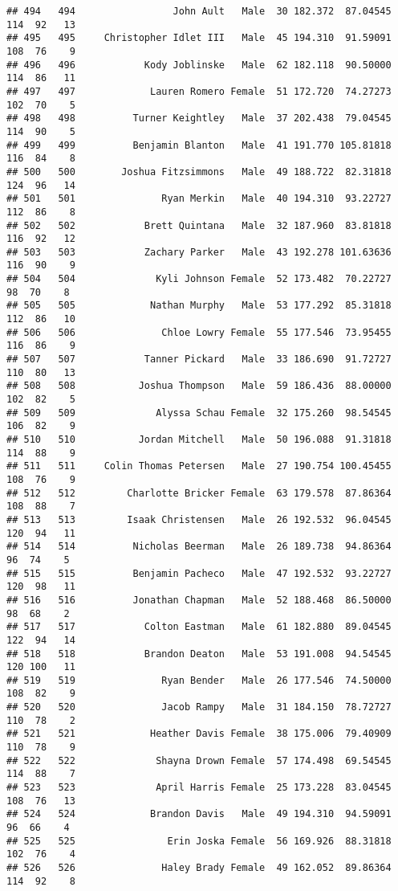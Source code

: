 \documentclass[
]{article}
\begin{document}
\begin{verbatim}
## 494   494                 John Ault   Male  30 182.372  87.04545 114  92   13
## 495   495     Christopher Idlet III   Male  45 194.310  91.59091 108  76    9
## 496   496            Kody Joblinske   Male  62 182.118  90.50000 114  86   11
## 497   497             Lauren Romero Female  51 172.720  74.27273 102  70    5
## 498   498          Turner Keightley   Male  37 202.438  79.04545 114  90    5
## 499   499          Benjamin Blanton   Male  41 191.770 105.81818 116  84    8
## 500   500        Joshua Fitzsimmons   Male  49 188.722  82.31818 124  96   14
## 501   501               Ryan Merkin   Male  40 194.310  93.22727 112  86    8
## 502   502            Brett Quintana   Male  32 187.960  83.81818 116  92   12
## 503   503            Zachary Parker   Male  43 192.278 101.63636 116  90    9
## 504   504              Kyli Johnson Female  52 173.482  70.22727  98  70    8
## 505   505             Nathan Murphy   Male  53 177.292  85.31818 112  86   10
## 506   506               Chloe Lowry Female  55 177.546  73.95455 116  86    9
## 507   507            Tanner Pickard   Male  33 186.690  91.72727 110  80   13
## 508   508           Joshua Thompson   Male  59 186.436  88.00000 102  82    5
## 509   509              Alyssa Schau Female  32 175.260  98.54545 106  82    9
## 510   510           Jordan Mitchell   Male  50 196.088  91.31818 114  88    9
## 511   511     Colin Thomas Petersen   Male  27 190.754 100.45455 108  76    9
## 512   512         Charlotte Bricker Female  63 179.578  87.86364 108  88    7
## 513   513         Isaak Christensen   Male  26 192.532  96.04545 120  94   11
## 514   514          Nicholas Beerman   Male  26 189.738  94.86364  96  74    5
## 515   515          Benjamin Pacheco   Male  47 192.532  93.22727 120  98   11
## 516   516          Jonathan Chapman   Male  52 188.468  86.50000  98  68    2
## 517   517            Colton Eastman   Male  61 182.880  89.04545 122  94   14
## 518   518            Brandon Deaton   Male  53 191.008  94.54545 120 100   11
## 519   519               Ryan Bender   Male  26 177.546  74.50000 108  82    9
## 520   520               Jacob Rampy   Male  31 184.150  78.72727 110  78    2
## 521   521             Heather Davis Female  38 175.006  79.40909 110  78    9
## 522   522              Shayna Drown Female  57 174.498  69.54545 114  88    7
## 523   523              April Harris Female  25 173.228  83.04545 108  76   13
## 524   524             Brandon Davis   Male  49 194.310  94.59091  96  66    4
## 525   525                Erin Joska Female  56 169.926  88.31818 102  76    4
## 526   526               Haley Brady Female  49 162.052  89.86364 114  92    8

\end{verbatim}
\end{document}
